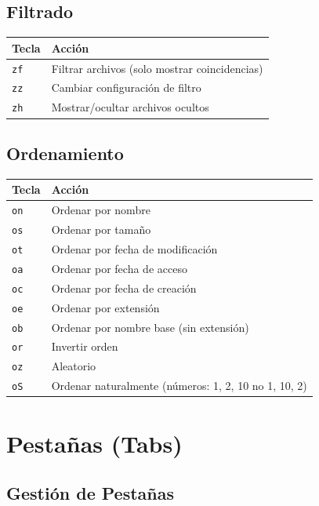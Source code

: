 \documentclass[
  doc,
  floatsintext,
  longtable,
  a4paper,
  nolmodern,
  notxfonts,
  notimes,
  12pt,
  colorlinks=true,linkcolor=blue,citecolor=blue,urlcolor=blue]{apa7}
\newcounter{none} %
\begin{document}
\subsection{Filtrado}\label{filtrado}

{\def\LTcaptype{none} %
\begin{longtable}[]{@{}ll@{}}
\toprule\noalign{}
Tecla & Acción \\
\midrule\noalign{}
\endhead
\bottomrule\noalign{}
\endlastfoot
\texttt{zf} & Filtrar archivos (solo mostrar coincidencias) \\
\texttt{zz} & Cambiar configuración de filtro \\
\texttt{zh} & Mostrar/ocultar archivos ocultos \\
\end{longtable}
}

\subsection{Ordenamiento}\label{ordenamiento}

{\def\LTcaptype{none} %
\begin{longtable}[]{@{}ll@{}}
\toprule\noalign{}
Tecla & Acción \\
\midrule\noalign{}
\endhead
\bottomrule\noalign{}
\endlastfoot
\texttt{on} & Ordenar por nombre \\
\texttt{os} & Ordenar por tamaño \\
\texttt{ot} & Ordenar por fecha de modificación \\
\texttt{oa} & Ordenar por fecha de acceso \\
\texttt{oc} & Ordenar por fecha de creación \\
\texttt{oe} & Ordenar por extensión \\
\texttt{ob} & Ordenar por nombre base (sin extensión) \\
\texttt{or} & Invertir orden \\
\texttt{oz} & Aleatorio \\
\texttt{oS} & Ordenar naturalmente (números: 1, 2, 10 no 1, 10, 2) \\
\end{longtable}
}

\section{Pestañas (Tabs)}\label{pestauxf1as-tabs}

\subsection{Gestión de Pestañas}\label{gestiuxf3n-de-pestauxf1as}
\end{document}
